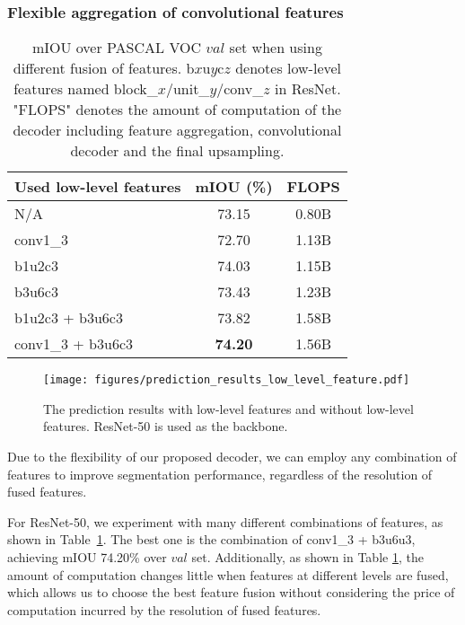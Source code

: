 \documentclass[10pt,twocolumn,letterpaper]{article}
\newcommand{\1}{{\mathbbm{1}}}
\begin{document}
\subsubsection{Flexible aggregation of convolutional features}



\begin{table}
\begin{center}
\small
\begin{tabular}{l|c|c}
\hline
Used low-level features & mIOU (\%) & FLOPS\\
\hline\hline
N/A & 73.15 & 0.80B \\
conv1\_3 & 72.70 & 1.13B \\
b1u2c3 & 74.03 & 1.15B \\
b3u6c3 & 73.43 & 1.23B \\
b1u2c3 + b3u6c3 & 73.82 & 1.58B \\
conv1\_3 + b3u6c3 & \textbf{74.20} & 1.56B \\
\hline
\end{tabular}
\end{center}
\vspace{-0.5cm}
\caption{mIOU over PASCAL VOC $val$ set when using different fusion of features. b$x$u$y$c$z$ denotes low-level features named block\_$x$/unit\_$y$/conv\_$z$ in ResNet. "FLOPS" denotes the amount of computation of the decoder including feature aggregation, convolutional decoder and the final upsampling.}
\label{table:combination_of_features}
\vspace{-0.7cm}
\end{table}

\begin{figure}[!b]
  \centering
  \texttt{[image: figures/prediction\_results\_low\_level\_feature.pdf]}
  \caption{The prediction results with low-level features and without low-level features. ResNet-50 is used as the backbone.}
  \label{fig:prediction_results}
\end{figure}

Due  to the flexibility of our proposed decoder, we can employ any combination of features to improve segmentation performance, regardless of the resolution of fused features.

For ResNet-50, we experiment with many different combinations of features, as shown in Table~\ref{table:combination_of_features}. The best one is the combination of conv1\_3 + b3u6u3, achieving mIOU 74.20\% over $val$ set. Additionally, as shown in Table \ref{table:combination_of_features}, the amount of computation changes little when features at different levels are fused, which allows us to choose the best feature fusion without considering the price of computation incurred by the resolution of fused features.
\end{document}
